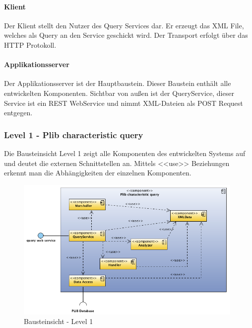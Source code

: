 \paragraph{Klient}

Der Klient stellt den Nutzer des Query Services dar. Er erzeugt das XML File, welches als Query an den Service geschickt wird. Der Transport erfolgt über das HTTP Protokoll.  

\paragraph{Applikationsserver}

Der Applikationsserver ist der Hauptbaustein. Dieser Baustein enthält alle entwickelten Komponenten. Sichtbar von außen ist der QueryService, dieser Service ist ein REST WebService und nimmt XML-Dateien als POST Request entgegen. 

\subsubsection{Level 1 - Plib characteristic query} 

Die Bausteinsicht Level 1 zeigt alle Komponenten des entwickelten Systems auf und deutet die externen Schnittstellen an. Mittels <<use>> Beziehungen erkennt man die Abhängigkeiten der einzelnen Komponenten. 

\begin{figure}[htbp]
	\centering
		\includegraphics[width=0.98\textwidth]{images/bausteinsicht_plib_level1.png}
	\caption{Bausteinsicht - Level 1}
	\label{fig:bausteinsicht_level1}
\end{figure}

